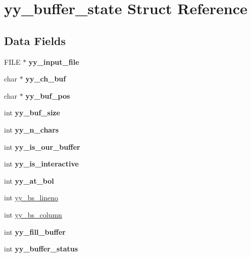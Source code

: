 \hypertarget{structyy__buffer__state}{}\section{yy\+\_\+buffer\+\_\+state Struct Reference}
\label{structyy__buffer__state}
\subsection*{Data Fields}
\begin{DoxyCompactItemize}
\item 
\mbox{\label{structyy__buffer__state_afb2a40bf9a1b84be81d8e8c0bbcbee21}} 
F\+I\+LE $\ast$ {\bfseries yy\+\_\+input\+\_\+file}
\item 
\mbox{\label{structyy__buffer__state_af61a9e79f8fc1edb3ae8a2fa2952ce22}} 
char $\ast$ {\bfseries yy\+\_\+ch\+\_\+buf}
\item 
\mbox{\label{structyy__buffer__state_ae8850ab3d90f9339c392020e7d83c4c7}} 
char $\ast$ {\bfseries yy\+\_\+buf\+\_\+pos}
\item 
\mbox{\label{structyy__buffer__state_ae404f23e6786820b0213464ffcf9fd03}} 
int {\bfseries yy\+\_\+buf\+\_\+size}
\item 
\mbox{\label{structyy__buffer__state_aa86c122f2050dbfd365fcf547e6fc1c3}} 
int {\bfseries yy\+\_\+n\+\_\+chars}
\item 
\mbox{\label{structyy__buffer__state_a1e64bbdc1343d886bee3af97e19644bc}} 
int {\bfseries yy\+\_\+is\+\_\+our\+\_\+buffer}
\item 
\mbox{\label{structyy__buffer__state_a2a823a361fbbe1af51a957d0d0cbf4e2}} 
int {\bfseries yy\+\_\+is\+\_\+interactive}
\item 
\mbox{\label{structyy__buffer__state_a8e60af6806593faf52d1cc01148af6e3}} 
int {\bfseries yy\+\_\+at\+\_\+bol}
\item 
int \hyperlink{structyy__buffer__state_a59c414c619ca0071fe3a091336106d82}{yy\+\_\+bs\+\_\+lineno}
\item 
int \hyperlink{structyy__buffer__state_ad9867983bbc1666304d83623cd6e3dd8}{yy\+\_\+bs\+\_\+column}
\item 
\mbox{\label{structyy__buffer__state_a5e492694db97a0d7760d8cc5fd058dfd}} 
int {\bfseries yy\+\_\+fill\+\_\+buffer}
\item 
\mbox{\label{structyy__buffer__state_a6ca09e676a787676260c558a0f731285}} 
int {\bfseries yy\+\_\+buffer\+\_\+status}
\end{DoxyCompactItemize}


